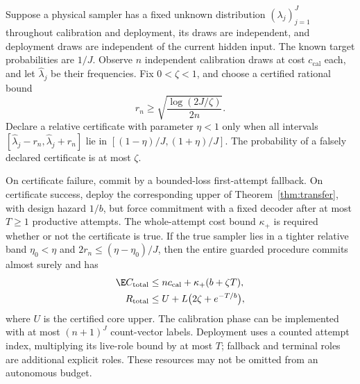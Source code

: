 \begin{proposition}\label{prop:pilot}
Suppose a physical sampler has a fixed unknown distribution $(\lambda_j)_{j=1}^J$ throughout calibration and deployment, its draws are independent, and deployment draws are independent of the current hidden input. The known target probabilities are $1/J$. Observe $n$ independent calibration draws at cost $c_{\mathrm{cal}}$ each, and let $\widehat\lambda_j$ be their frequencies. Fix $0<\zeta<1$, and choose a certified rational bound
\[
 r_n\ge\sqrt{\frac{\log(2J/\zeta)}{2n}}.
\]
Declare a relative certificate with parameter $\eta<1$ only when all intervals $[\widehat\lambda_j-r_n,\widehat\lambda_j+r_n]$ lie in $[(1-\eta)/J,(1+\eta)/J]$. The probability of a falsely declared certificate is at most $\zeta$.

On certificate failure, commit by a bounded-loss first-attempt fallback. On certificate success, deploy the corresponding upper of Theorem~\ref{thm:transfer}, with design hazard $1/b$, but force commitment with a fixed decoder after at most $T\ge1$ productive attempts. The whole-attempt cost bound $\kappa_+$ is required whether or not the certificate is true. If the true sampler lies in a tighter relative band $\eta_0<\eta$ and $2r_n\le(\eta-\eta_0)/J$, then the entire guarded procedure commits almost surely and has
\begin{align}
 \E C_{\mathrm{total}}&\le nc_{\mathrm{cal}}+\kappa_+(b+\zeta T),\label{eq:pilot-cost}\\
 R_{\mathrm{total}}&\le U+L\bigl(2\zeta+e^{-T/b}\bigr),\label{eq:pilot-risk}
\end{align}
where $U$ is the certified core upper. The calibration phase can be implemented with at most $(n+1)^J$ count-vector labels. Deployment uses a counted attempt index, multiplying its live-role bound by at most $T$; fallback and terminal roles are additional explicit roles. These resources may not be omitted from an autonomous budget.
\end{proposition}
